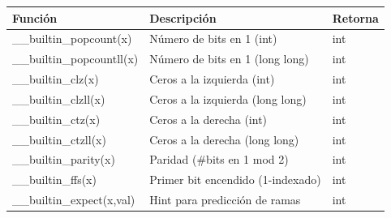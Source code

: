 \begin{longtable}{>{\ttfamily}p{3.4cm} p{5.5cm} p{1.2cm}}
\toprule
Función & Descripción & Retorna \\
\midrule
\endhead

\_\_builtin\_popcount(x) & Número de bits en 1 (int) & int \\

\_\_builtin\_popcountll(x) & Número de bits en 1 (long long) & int \\

\_\_builtin\_clz(x) & Ceros a la izquierda (int) & int \\

\_\_builtin\_clzll(x) & Ceros a la izquierda (long long) & int \\

\_\_builtin\_ctz(x) & Ceros a la derecha (int) & int \\

\_\_builtin\_ctzll(x) & Ceros a la derecha (long long) & int \\

\_\_builtin\_parity(x) & Paridad (\#bits en 1 mod 2) & int \\

\_\_builtin\_ffs(x) & Primer bit encendido (1-indexado) & int \\

\_\_builtin\_expect(x,val) & Hint para predicción de ramas & int \\

\bottomrule
\end{longtable}